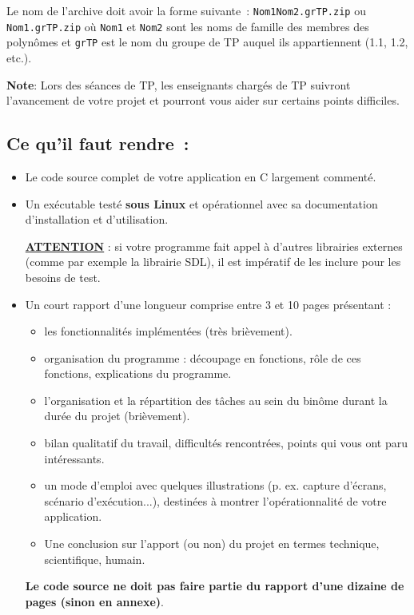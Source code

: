 \documentclass[10pt]{article}
\begin{document}
\medskip
\noindent
Le nom de l'archive doit avoir la forme suivante~: \texttt{Nom1Nom2.grTP.zip} ou 
\texttt{Nom1.grTP.zip} où \texttt{Nom1} et \texttt{Nom2} sont les noms de 
famille des membres des polynômes et \texttt{grTP} est le nom du groupe de TP 
auquel ils appartiennent (1.1, 1.2, etc.).

\medskip
\noindent
{\bf Note}: Lors des séances de TP, les enseignants chargés de TP suivront l'avancement de votre projet et pourront vous aider sur certains points difficiles.

\subsection*{Ce qu'il faut rendre~:}
\begin{itemize}
\item Le code source complet de votre application en C largement commenté.

\item Un exécutable test\'e \textbf{sous Linux} et opérationnel avec sa documentation d'installation et d'utilisation. 

\underline{\bf ATTENTION} :
si votre programme fait appel à d'autres librairies externes (comme par exemple 
la librairie SDL), il est impératif de les inclure pour les besoins de test. 

\item Un court rapport d'une longueur comprise entre 3 et 10 pages présentant :
  \begin{itemize}
    \item les fonctionnalités implémentées (très brièvement).
    \item organisation du programme : découpage en fonctions, rôle de 
      ces fonctions, explications du programme. 
    \item l'organisation et la répartition des tâches au sein du binôme 
      durant la durée du projet (brièvement).
    \item bilan qualitatif du travail, difficultés rencontrées, points qui 
      vous ont paru intéressants. 
    \item un mode d'emploi avec quelques illustrations (p. ex. capture d'écrans, 
      scénario d'exécution...), destinées à montrer l'opérationnalité 
      de votre application.
    \item Une conclusion sur l'apport (ou non) du projet en termes technique,
      scientifique, humain. 
  \end{itemize}

\textbf{Le code source ne doit pas faire partie du rapport d'une dizaine de pages 
(sinon en annexe)}.
\end{itemize}
\end{document}
